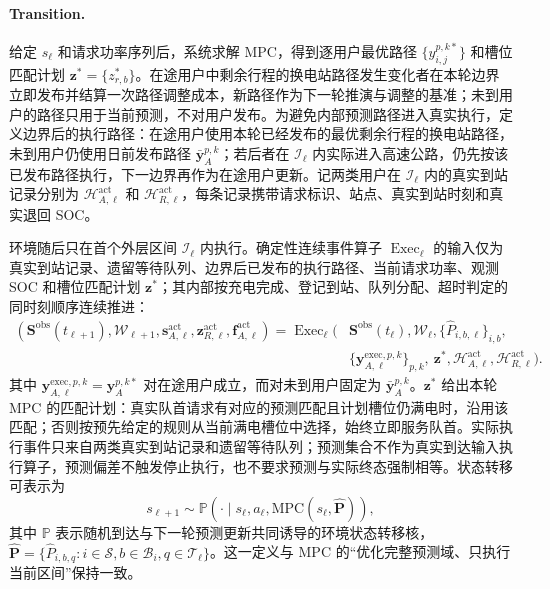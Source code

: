 \documentclass[12pt,a4paper,UTF8]{ctexart}
\begin{document}
\paragraph{Transition.}
给定 $s_\ell$ 和请求功率序列后，系统求解 MPC，得到逐用户最优路径
$\{y_{i,j}^{p,k*}\}$ 和槽位匹配计划 $\mathbf z^*=\{z_{r,b}^*\}$。在途用户中剩余行程的换电站路径发生变化者在本轮边界立即发布并结算一次路径调整成本，新路径作为下一轮推演与调整的基准；未到用户的路径只用于当前预测，不对用户发布。为避免内部预测路径进入真实执行，定义边界后的执行路径：在途用户使用本轮已经发布的最优剩余行程的换电站路径，未到用户仍使用日前发布路径 $\bar{\mathbf y}_{A}^{p,k}$；若后者在 $\mathcal I_\ell$ 内实际进入高速公路，仍先按该已发布路径执行，下一边界再作为在途用户更新。记两类用户在 $\mathcal I_\ell$ 内的真实到站记录分别为 $\mathcal H_{A,\ell}^{\mathrm{act}}$ 和 $\mathcal H_{R,\ell}^{\mathrm{act}}$，每条记录携带请求标识、站点、真实到站时刻和真实退回 SOC。

环境随后只在首个外层区间 $\mathcal I_\ell$ 内执行。确定性连续事件算子 $\operatorname{Exec}_\ell$ 的输入仅为真实到站记录、遗留等待队列、边界后已发布的执行路径、当前请求功率、观测 SOC 和槽位匹配计划 $\mathbf z^*$；其内部按充电完成、登记到站、队列分配、超时判定的同时刻顺序连续推进：
\begin{equation}
\begin{aligned}
(\mathbf S^{\mathrm{obs}}(t_{\ell+1}),\mathcal W_{\ell+1},
\mathbf s_{A,\ell}^{\mathrm{act}},\mathbf z_{R,\ell}^{\mathrm{act}},
\mathbf f_{A,\ell}^{\mathrm{act}})
=\operatorname{Exec}_\ell\!\Big(&
\mathbf S^{\mathrm{obs}}(t_\ell),\mathcal W_\ell,
\{\widehat P_{i,b,\ell}\}_{i,b},\\
&\{\mathbf y_{A,\ell}^{\mathrm{exec},p,k}\}_{p,k},\ \mathbf z^*,
\mathcal H_{A,\ell}^{\mathrm{act}},\mathcal H_{R,\ell}^{\mathrm{act}}
\Big).
\end{aligned}
\label{eq:actual_execution_operator}
\end{equation}
其中 $\mathbf y_{A,\ell}^{\mathrm{exec},p,k}=\mathbf y_A^{p,k*}$ 对在途用户成立，而对未到用户固定为 $\bar{\mathbf y}_{A}^{p,k}$。$\mathbf z^*$ 给出本轮 MPC 的匹配计划：真实队首请求有对应的预测匹配且计划槽位仍满电时，沿用该匹配；否则按预先给定的规则从当前满电槽位中选择，始终立即服务队首。实际执行事件只来自两类真实到站记录和遗留等待队列；预测集合不作为真实到达输入执行算子，预测偏差不触发停止执行，也不要求预测与实际终态强制相等。状态转移可表示为
\begin{equation}
s_{\ell+1}
\sim
\mathbb P\!\left(
\cdot\mid
s_\ell,a_\ell,
\mathrm{MPC}(s_\ell,\widehat{\mathbf P})
\right),
\label{eq:rl_transition}
\end{equation}
其中 $\mathbb P$ 表示随机到达与下一轮预测更新共同诱导的环境状态转移核，$\widehat{\mathbf P}=\{\widehat P_{i,b,q}:i\in\mathcal S,b\in\mathcal B_i,q\in\mathcal T_\ell\}$。这一定义与 MPC 的“优化完整预测域、只执行当前区间”保持一致。
\end{document}
